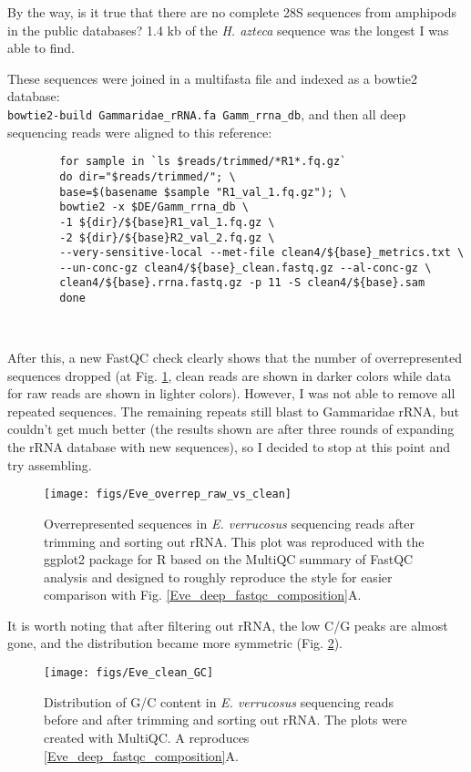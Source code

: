 \documentclass[12pt]{article}
\begin{document}
By the way, is it true that there are no complete 28S sequences from amphipods in the public databases? 1.4 kb of the \textit{H. azteca} sequence was the longest I was able to find.
		
		These sequences were joined in a multifasta file and indexed as a bowtie2 database: \\
		\verb|bowtie2-build Gammaridae_rRNA.fa Gamm_rrna_db|,
		and then all deep sequencing reads were aligned to this reference:

\bigskip 
		\begin{verbatim}
		for sample in `ls $reads/trimmed/*R1*.fq.gz` 
		do dir="$reads/trimmed/"; \
		base=$(basename $sample "R1_val_1.fq.gz"); \
		bowtie2 -x $DE/Gamm_rrna_db \
		-1 ${dir}/${base}R1_val_1.fq.gz \
		-2 ${dir}/${base}R2_val_2.fq.gz \
		--very-sensitive-local --met-file clean4/${base}_metrics.txt \
		--un-conc-gz clean4/${base}_clean.fastq.gz --al-conc-gz \
		clean4/${base}.rrna.fastq.gz -p 11 -S clean4/${base}.sam
		done
		
		
		\end{verbatim}
		
After this, a new FastQC check clearly shows that the number of overrepresented sequences dropped (at Fig. \ref{Eve_overrep_raw_vs_clean}, clean reads are shown in darker colors while data for raw reads are shown in lighter colors). However, I was not able to remove all repeated sequences. The remaining repeats still blast to Gammaridae rRNA, but couldn't get much better (the results shown are after three rounds of expanding the rRNA database with new sequences), so I decided to stop at this point and try assembling. 

\begin{figure}[H]
\texttt{[image: figs/Eve\_overrep\_raw\_vs\_clean]}
\caption{Overrepresented sequences in \textit{E. verrucosus} sequencing reads after trimming and sorting out rRNA. This plot was reproduced with the ggplot2 package for R based on the MultiQC summary of FastQC analysis and designed to roughly reproduce the style for easier comparison with Fig. \ref{Eve_deep_fastqc_composition}A.} %
\label{Eve_overrep_raw_vs_clean}
\end{figure}

It is worth noting that after filtering out rRNA, the low C/G peaks are almost gone, and the distribution became more symmetric (Fig. \ref{Eve_clean_GC}).
		
\begin{figure}[H]
\texttt{[image: figs/Eve\_clean\_GC]}
\caption{Distribution of G/C content in \textit{E. verrucosus} sequencing reads before and after trimming and sorting out rRNA. The plots were created with MultiQC. A reproduces \ref{Eve_deep_fastqc_composition}A.} %
\label{Eve_clean_GC}
\end{figure}
		
\end{document}
